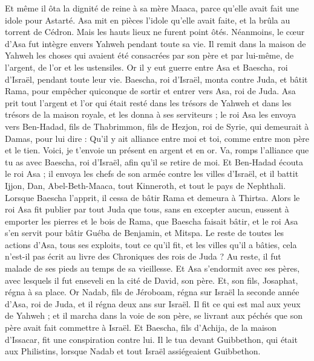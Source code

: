 \begin{multicols}{2}
Et même il ôta la dignité de reine à sa mère Maaca, parce qu'elle avait fait une idole pour Astarté. Asa mit en pièces l'idole qu'elle avait faite, et la brûla au torrent de Cédron.
Mais les hauts lieux ne furent point ôtés. Néanmoins, le cœur d'Asa fut intègre envers Yahweh pendant toute sa vie.
Il remit dans la maison de Yahweh les choses qui avaient été consacrées par son père et par lui-même, de l'argent, de l'or et les ustensiles.
Or il y eut guerre entre Asa et Baescha, roi d'Israël, pendant toute leur vie.
Baescha, roi d'Israël, monta contre Juda, et bâtit Rama, pour empêcher quiconque de sortir et entrer vers Asa, roi de Juda.
Asa prit tout l'argent et l'or qui était resté dans les trésors de Yahweh et dans les trésors de la maison royale, et les donna à ses serviteurs ; le roi Asa les envoya vers Ben-Hadad, fils de Thabrimmon, fils de Hezjon, roi de Syrie, qui demeurait à Damas, pour lui dire :
Qu'il y ait alliance entre moi et toi, comme entre mon père et le tien. Voici, je t'envoie un présent en argent et en or. Va, romps l'alliance que tu as avec Baescha, roi d'Israël, afin qu'il se retire de moi.
Et Ben-Hadad écouta le roi Asa ; il envoya les chefs de son armée contre les villes d'Israël, et il battit Ijjon, Dan, Abel-Beth-Maaca, tout Kinneroth, et tout le pays de Nephthali.
Lorsque Baescha l'apprit, il cessa de bâtir Rama et demeura à Thirtsa.
Alors le roi Asa fit publier par tout Juda que tous, sans en excepter aucun, eussent à emporter les pierres et le bois de Rama, que Baescha faisait bâtir, et le roi Asa s'en servit pour bâtir Guéba de Benjamin, et Mitspa.
Le reste de toutes les actions d'Asa, tous ses exploits, tout ce qu'il fit, et les villes qu'il a bâties, cela n'est-il pas écrit au livre des Chroniques des rois de Juda ? Au reste, il fut malade de ses pieds au temps de sa vieillesse.
Et Asa s'endormit avec ses pères, avec lesquels il fut enseveli en la cité de David, son père. Et, son fils, Josaphat, régna à sa place.
Or Nadab, fils de Jéroboam, régna sur Israël la seconde année d'Asa, roi de Juda, et il régna deux ans sur Israël.
Il fit ce qui est mal aux yeux de Yahweh ; et il marcha dans la voie de son père, se livrant aux péchés que son père avait fait commettre à Israël.
Et Baescha, fils d'Achija, de la maison d'Issacar, fit une conspiration contre lui. Il le tua devant Guibbethon, qui était aux Philistins, lorsque Nadab et tout Israël assiégeaient Guibbethon.

\end{multicols}
